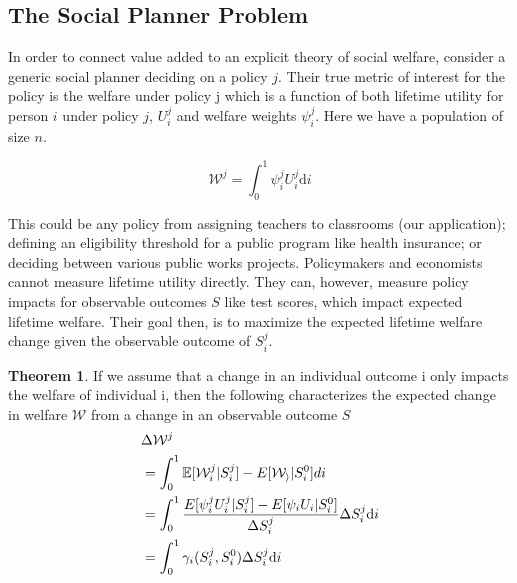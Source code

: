 \documentclass[12pt]{article}
\theoremstyle{definition}
\theoremstyle{definition}
\theoremstyle{definition}
\theoremstyle{definition}
\newtheorem{thm}{Theorem}
\begin{document}
\subsection{The Social Planner Problem}

    

    
    
    In order to connect value added to an explicit theory of social welfare, consider a generic social planner deciding on a policy $j$. Their true metric of interest for the policy is the welfare under policy j which is a function of both lifetime utility for person $i$ under policy $j$, $U^j_i$ and welfare weights $\psi^j_i$. Here we have a population of size $n$.
            
        \begin{equation}
        \mathcal{W}^j =  \int_0^1 \psi^j_i U^j_i \text{d}i
        \end{equation}
    
    This could be any policy from assigning teachers to classrooms (our application);  defining an eligibility threshold for a public program like health insurance; or deciding between various public works projects. Policymakers and economists cannot measure lifetime utility directly. They can, however, measure policy impacts for observable outcomes $S$ like test scores, which impact expected lifetime welfare. Their goal then, is to maximize the expected lifetime welfare change given the observable outcome of $S_i^j$.
    
    \begin{thm}
    \label{def_welfare_change}
    If we assume that a change in an individual outcome i only impacts the welfare of individual i, then the following characterizes the expected change in welfare $\mathcal{W}$ from a change in an observable outcome $S$
    \begin{align}
           &  \Delta \mathcal{W}^j \\
           & = \int_0^1 \mathbb{E}[\mathcal{W}^j_i|S_i^j] - E[\mathcal{W_i}|S_i^0] di  \\
           &  = \int_0^1 \frac{E[\psi^j_i U^j_i |S_i^j] - E[\psi_i U_i |S_i^0]}{\Delta S^j_i} \Delta S^j_i\text{d}i \\ 
          &   = \int_0^1 \gamma_i(S_i^j, S_i^0) \Delta S^j_i \text{d}i
    \end{align}
    \end{thm}
\end{document}
